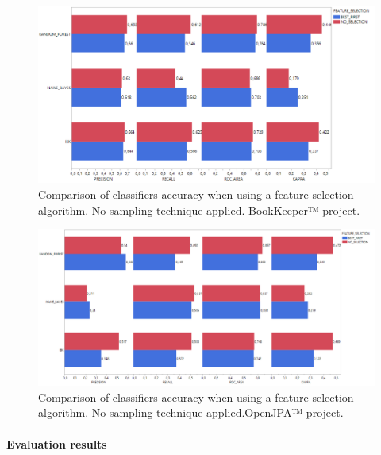 \documentclass[sigconf]{acmart}
\begin{document}
\begin{figure}[h!]
  \centering
  \includegraphics[width=\textwidth]{./BOOKKEEPER/FeatureSelection.png}
  \caption{Comparison of classifiers accuracy when using a feature selection algorithm. No sampling technique applied. \newline BookKeeper™ project. \newline}
  \label{BOOKKEEPER-FeatureSelection}
\end{figure}

\begin{figure}[h!]
  \centering
  \includegraphics[width=\textwidth]{./OPENJPA/FeatureSelection.png}
  \caption{Comparison of classifiers accuracy when using a feature selection algorithm. No sampling technique applied.\newline OpenJPA™ project. \newline}
  \label{OPENJPA-FeatureSelection}
\end{figure}

\FloatBarrier

\paragraph{Evaluation results}
\hfill\\
\end{document}
